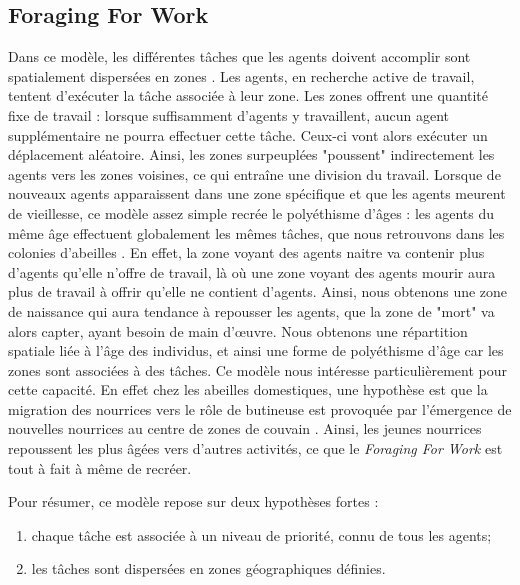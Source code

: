 	
		\subsection{Foraging For Work}
        Dans ce modèle, les différentes tâches que les agents doivent accomplir sont spatialement dispersées en zones \cite{franks_foraging_1994}. Les agents, en recherche active de travail, tentent d'exécuter la tâche associée à leur zone. Les zones offrent une quantité fixe de travail : lorsque suffisamment d'agents y travaillent, aucun agent supplémentaire ne pourra effectuer cette tâche. Ceux-ci vont alors exécuter un déplacement aléatoire. Ainsi, les zones surpeuplées "poussent" indirectement les agents vers les zones voisines, ce qui entraîne une division du travail. Lorsque de nouveaux agents apparaissent dans une zone spécifique et que les agents meurent de vieillesse, ce modèle assez simple recrée le polyéthisme d'âges : les agents du même âge effectuent globalement les mêmes tâches, que nous retrouvons dans les colonies d'abeilles \cite{seeley_age_1991}. En effet, la zone voyant des agents naitre va contenir plus d'agents qu'elle n'offre de travail, là où une zone voyant des agents mourir aura plus de travail à offrir qu'elle ne contient d'agents. Ainsi, nous obtenons une zone de naissance qui aura tendance à repousser les agents, que la zone de "mort" va alors capter, ayant besoin de main d'œuvre. Nous obtenons une répartition spatiale liée à l'âge des individus, et ainsi une forme de polyéthisme d'âge car les zones sont associées à des tâches. Ce modèle nous intéresse particulièrement pour cette capacité. En effet chez les abeilles domestiques, une hypothèse est que la migration des nourrices vers le rôle de butineuse est provoquée par l'émergence de nouvelles nourrices au centre de zones de couvain  \cite{seeley_age_1991}. Ainsi, les jeunes nourrices repoussent les plus âgées vers d'autres activités, ce que le \textit{Foraging For Work} est tout à fait à même de recréer.
        
        Pour résumer, ce modèle repose sur deux hypothèses fortes :
        
        \begin{enumerate}
        \item chaque tâche est associée à un niveau de priorité, connu de tous les agents;
        
        \item les tâches sont dispersées en zones géographiques définies.
        \end{enumerate}
        
